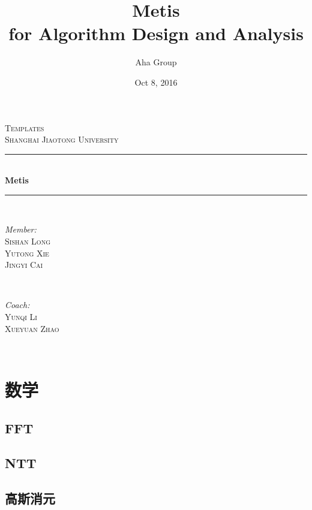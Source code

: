 \documentclass[11pt]{article}
\title{Metis \\ for Algorithm Design and Analysis}
\author{Aha Group}
\date{Oct 8, 2016}
\begin{document}
\begin{titlepage}

\newcommand{\HRule}{\rule{\linewidth}{0.5mm}}
\center
\textsc{\LARGE Templates}\\[1.5cm] 
\textsc{\Large Shanghai Jiaotong University}\\[0.5cm]
\HRule \\[0.4cm]
{ \huge \bfseries Metis}\\[0.4cm] 
\HRule \\[1.5cm]

\begin{minipage}{0.4\textwidth}
\begin{flushleft} \large
\emph{Member:}\\
 \textsc{Sishan Long \\ Yutong Xie \\ Jingyi Cai}
\end{flushleft}
\end{minipage}
~
\begin{minipage}{0.4\textwidth}
\begin{flushright} \large
\emph{Coach:} \\
\textsc{Yunqi Li \\ Xueyuan Zhao}
\end{flushright}
\end{minipage}\\[4cm]



\vfill

\end{titlepage}
	\newpage	
	
	\tableofcontents
	\newpage
	
	\section{数学}
		\subsection{FFT}
		
		\subsection{NTT}
		
		\subsection{高斯消元}
		
\end{document}
